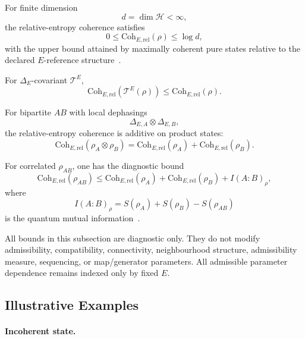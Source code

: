 \documentclass[aps,prx,onecolumn,11pt]{revtex4-2}
\theoremstyle{plain}
\theoremstyle{definition}
\theoremstyle{remark}
\begin{document}
For finite dimension
\[
d=\dim\mathcal{H}<\infty,
\]
the relative-entropy coherence satisfies
\begin{equation}
0
\leq
\mathrm{Coh}_{E,\mathrm{rel}}(\rho)
\leq
\log d,
\label{eq:coh_rel_bounds}
\end{equation}
with the upper bound attained by maximally coherent pure states relative
to the declared \(E\)-reference structure~\cite{Baumgratz2014,ChitambarGour2019}.

For \(\Delta_E\)-covariant \(\mathcal{T}^E\),
\begin{equation}
\mathrm{Coh}_{E,\mathrm{rel}}(\mathcal{T}^E(\rho))
\leq
\mathrm{Coh}_{E,\mathrm{rel}}(\rho).
\label{eq:coh_rel_monotone}
\end{equation}

For bipartite \(AB\) with local dephasings
\[
\Delta_{E,A}\otimes\Delta_{E,B},
\]
the relative-entropy coherence is additive on product states:
\begin{equation}
\mathrm{Coh}_{E,\mathrm{rel}}(\rho_A\otimes\rho_B)
=
\mathrm{Coh}_{E,\mathrm{rel}}(\rho_A)
+
\mathrm{Coh}_{E,\mathrm{rel}}(\rho_B).
\label{eq:coh_rel_additive_products}
\end{equation}

For correlated \(\rho_{AB}\), one has the diagnostic bound
\begin{equation}
\mathrm{Coh}_{E,\mathrm{rel}}(\rho_{AB})
\leq
\mathrm{Coh}_{E,\mathrm{rel}}(\rho_A)
+
\mathrm{Coh}_{E,\mathrm{rel}}(\rho_B)
+
I(A{:}B)_\rho,
\label{eq:coh_rel_correlation_bound}
\end{equation}
where
\[
I(A{:}B)_\rho
=
S(\rho_A)+S(\rho_B)-S(\rho_{AB})
\]
is the quantum mutual information~\cite{NielsenChuang2010,ChitambarGour2019}.

All bounds in this subsection are diagnostic only. They do not modify
admissibility, compatibility, connectivity, neighbourhood structure,
admissibility measure, sequencing, or map/generator parameters. All
admissible parameter dependence remains indexed only by fixed \(E\).

\subsection{Illustrative Examples}
\label{appA:illustrative_examples}

\paragraph{Incoherent state.}
\end{document}
